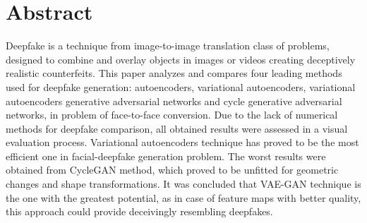 \chapter{Abstract}
Deepfake is a technique from image-to-image translation class of problems, designed to combine and overlay objects in images or videos creating deceptively realistic counterfeits. This paper analyzes and compares four leading methods used for deepfake generation: autoencoders, variational autoencoders,  variational autoencoders generative adversarial networks and cycle generative adversarial networks, in problem of face-to-face conversion. Due to the lack of numerical methods for deepfake comparison, all obtained results were assessed in a visual evaluation process. Variational autoencoders technique has proved to be the most efficient one in facial-deepfake generation problem. The worst results were obtained from CycleGAN method, which proved to be unfitted for geometric changes and shape transformations. It was concluded that VAE-GAN technique is the one with the greatest potential, as in case of feature maps with better quality, this approach could provide deceivingly resembling deepfakes.
